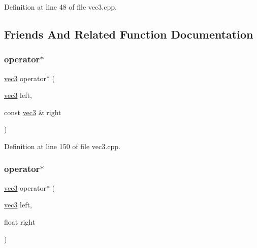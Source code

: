 Definition at line 48 of file vec3.\+cpp.



\subsection{Friends And Related Function Documentation}
\mbox{\label{structspork_1_1maths_1_1vec3_a02f8c1e00fe963541dbbc13a4790c651}} 
\subsubsection{\texorpdfstring{operator$\ast$}{operator*}\hspace{0.1cm}{\footnotesize\ttfamily [1/2]}}
{\footnotesize\ttfamily \hyperlink{structspork_1_1maths_1_1vec3}{vec3} operator$\ast$ (\begin{DoxyParamCaption}\item[{\hyperlink{structspork_1_1maths_1_1vec3}{vec3}}]{left,  }\item[{const \hyperlink{structspork_1_1maths_1_1vec3}{vec3} \&}]{right }\end{DoxyParamCaption})\hspace{0.3cm}{\ttfamily [friend]}}



Definition at line 150 of file vec3.\+cpp.

\mbox{\label{structspork_1_1maths_1_1vec3_affd23437583b3ab1d0c1e3004c3cecfe}} 
\subsubsection{\texorpdfstring{operator$\ast$}{operator*}\hspace{0.1cm}{\footnotesize\ttfamily [2/2]}}
{\footnotesize\ttfamily \hyperlink{structspork_1_1maths_1_1vec3}{vec3} operator$\ast$ (\begin{DoxyParamCaption}\item[{\hyperlink{structspork_1_1maths_1_1vec3}{vec3}}]{left,  }\item[{float}]{right }\end{DoxyParamCaption})\hspace{0.3cm}{\ttfamily [friend]}}



